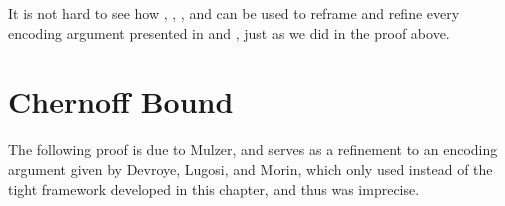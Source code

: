 It is not hard to see how , ,
, and  can be used to
reframe and refine every encoding argument presented in 
and , just as we did in the proof above.




\section{Chernoff Bound}

The following proof is due to Mulzer, and serves as a refinement to an
encoding argument given by Devroye, Lugosi, and Morin, which only used
 instead of the tight framework developed in this
chapter, and thus was imprecise.

